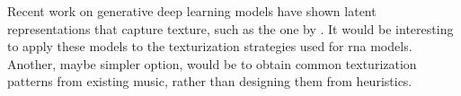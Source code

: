
Recent work on generative deep learning models have shown
latent representations that capture texture, such as the one
by \textcite{wang2020learning}. It would be interesting to
apply these models to the texturization strategies used for
\gls{rna} models. Another, maybe simpler option, would be to
obtain common texturization patterns from existing music,
rather than designing them from heuristics.
